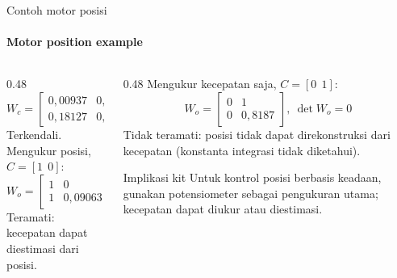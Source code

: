 \documentclass[aspectratio=169,10pt]{beamer}
\begin{document}
\begin{frame}{Contoh motor posisi}
	\framesubtitle{Motor position example}
	\begin{columns}[T]
		\begin{column}{0.48\textwidth}
			\small
			\[
				W_c = \begin{bmatrix} 0{,}00937 & 0{,}02579\\ 0{,}18127 & 0{,}14841\end{bmatrix},\ \det W_c = -0{,}00329
			\]
			Terkendali. \checkmark\\[6pt]
			Mengukur posisi, $C = [1\ \ 0]$:
			\[
				W_o = \begin{bmatrix} 1 & 0\\ 1 & 0{,}09063\end{bmatrix},\ \det W_o = 0{,}0906
			\]
			Teramati: kecepatan dapat diestimasi dari posisi. \checkmark
		\end{column}
		\begin{column}{0.48\textwidth}
			\small
			Mengukur kecepatan saja, $C = [0\ \ 1]$:
			\[
				W_o = \begin{bmatrix} 0 & 1\\ 0 & 0{,}8187\end{bmatrix},\ \det W_o = 0
			\]
			\alert{Tidak teramati}: posisi tidak dapat direkonstruksi dari kecepatan (konstanta integrasi tidak diketahui).
			\begin{block}{Implikasi kit}
				\scriptsize Untuk kontrol posisi berbasis keadaan, gunakan potensiometer sebagai pengukuran utama; kecepatan dapat diukur atau diestimasi.
			\end{block}
		\end{column}
	\end{columns}
\end{frame}
\end{document}
